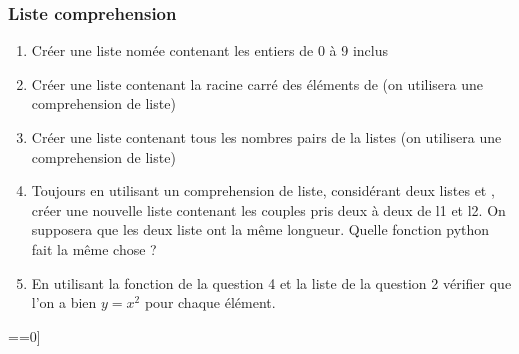 \documentclass[letterpaper,10pt,english]{sphinxhowto}
\begin{document}
\subsubsection{Liste comprehension}
\label{\detokenize{cours3_conteneur_corr_exercices:liste-comprehension}}\begin{enumerate}
%
\item {} 
\sphinxAtStartPar
Créer une liste nomée  contenant les entiers de 0 à 9 inclus

\item {} 
\sphinxAtStartPar
Créer une liste contenant la racine carré des éléments de  (on utilisera une comprehension de liste)

\item {} 
\sphinxAtStartPar
Créer une liste contenant tous les nombres pairs de la listes  (on utilisera une comprehension de liste)

\item {} 
\sphinxAtStartPar
Toujours en utilisant un comprehension de liste, considérant deux listes  et , créer une nouvelle liste contenant les couples pris deux à deux de l1 et l2. On supposera que les deux liste ont la même longueur. Quelle fonction python fait la même chose ?

\item {} 
\sphinxAtStartPar
En utilisant la fonction de la question 4 et la liste de la question 2 vérifier que l’on a bien \(y=x^2\) pour chaque élément.

\end{enumerate}

\begin{sphinxVerbatim}[commandchars=\\\{\}]
 
  
  \PYG{p}{[}    \PYG{p}{]}
  \PYG{p}{[}      ==0]
\end{sphinxVerbatim}
\end{document}
